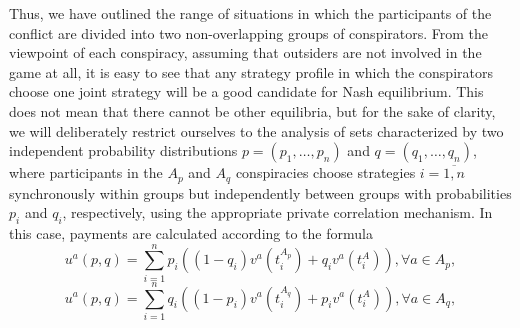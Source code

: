 Thus, we have outlined the range of situations in which the participants of the conflict are divided into two non-overlapping groups of conspirators. From the viewpoint of each conspiracy, assuming that outsiders are not involved in the game at all, it is easy to see that any strategy profile in which the conspirators choose one joint strategy will be a good candidate for Nash equilibrium. This does not mean that there cannot be other equilibria, but for the sake of clarity, we will deliberately restrict ourselves to the analysis of sets characterized by two independent probability distributions $p = (p_1, \ldots, p_n)$ and $q = (q_1, \ldots, q_n)$, where participants in the $A_p$ and $A_q$ conspiracies choose strategies $i = \overline{1,n}$ synchronously within groups but independently between groups with probabilities $p_i$ and $q_i$, respectively, using the appropriate private correlation mechanism. In this case, payments are calculated according to the formula %
\begin{equation*}
	u^a(p, q) = \sum_{i=1}^n p_i ((1 - q_i) v^a(t_i^{A_p}) + q_i v^a(t_i^A)), \forall a \in A_p,
\end{equation*}
\begin{equation*}
	u^a(p, q) = \sum_{i=1}^n q_i ((1 - p_i) v^a(t_i^{A_q}) + p_i v^a(t_i^A)), \forall a \in A_q,
\end{equation*}

